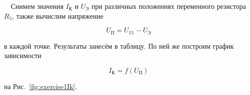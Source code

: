 \documentclass[12pt,a4paper]{article}
\begin{document}
\noindent\begin{minipage}{\textwidth}
	\begin{minipage}{0.48\textwidth}
		$\quad$Снимем значения $I_\text{К}$ и $U_\text{Э}$ при различных положениях переменного резистора $R_5$,
		также вычислим напряжение 
		
		\begin{equation*}
			U_\text{П} = U_{V1} - U_\text{Э}
		\end{equation*}
		
		в каждой точке. Результаты занесём в таблицу. По ней же построим график зависимости

		\begin{equation*}
			I_\text{К} = f(U_\text{П})
		\end{equation*}

		на Рис.~\ref{fig:exercise1Ik}. 

		\vspace{0.5em}


\end{minipage}
\end{minipage}
\end{document}
